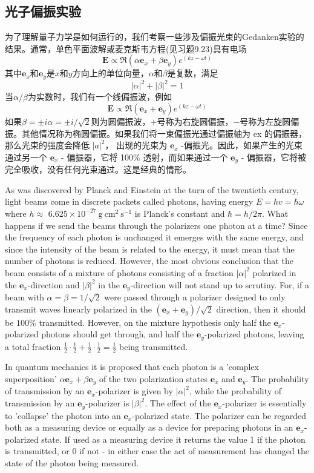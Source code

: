\documentclass[hyperref,UTF8]{ctexbook}
\begin{document}
\subsection{光子偏振实验}
为了理解量子力学是如何运行的，我们考察一些涉及偏振光束的Gedanken实验的结果。通常，单色平面波解或麦克斯韦方程(见习题9.23)具有电场
\[\mathbf{E}\propto \Re(\alpha \mathbf{e}_x+\beta\mathbf{e}_y)e^{(kz-\omega t)}\]
其中\(\mathbf{e}_x\)和\(\mathbf{e}_y\)是\(x\)和\(y\)方向上的单位向量，\(\alpha \)和\(\beta\)是复数，满足
\[|\alpha|^2+|\beta|^2=1\]
当\(\alpha/\beta\)为实数时，我们有一个线偏振波，例如
\[\mathbf{E}\propto \Re(\mathbf{e}_x+\mathbf{e}_y)e^{(kz-\omega t)}\]
如果\(\beta =\pm i\alpha = \pm i/\sqrt{2}\)则为圆偏振波，\(+\)号称为右旋圆偏振，\(-\)号称为左旋圆偏振。其他情况称为椭圆偏振。如果我们将一束偏振光通过偏振轴为 ex 的偏振器，那么光束的强度会降低 $|a|^{2}$， 出现的光束为 $\mathbf{e}_{x}$ -偏振光。因此，如果产生的光束通过另一个 $\mathbf{e}_{x}$ - 偏振器，它将 100\% 透射，而如果通过一个 $\mathbf{e}_{y}$ - 偏振器，它将被完全吸收，没有任何光束通过。这是经典的情形。

As was discovered by Planck and Einstein at the turn of the twentieth century, light beams come in discrete packets called photons, having energy $E=h v=\hbar \omega$ where $h \approx$ $6.625 \times 10^{-27} \mathrm{~g} \mathrm{~cm}^{2} \mathrm{~s}^{-1}$ is Planck's constant and $\hbar=h / 2 \pi$. What happens if we send the beams through the polarizers one photon at a time? Since the frequency of each photon is unchanged it emerges with the same energy, and since the intensity of the beam is related to the energy, it must mean that the number of photons is reduced. However, the most obvious conclusion that the beam consists of a mixture of photons consisting of a fraction $|\alpha|^{2}$ polarized in the $\mathbf{e}_{x}$-direction and $|\beta|^{2}$ in the $\mathbf{e}_{y}$-direction will not stand up to scrutiny. For, if a beam with $\alpha=\beta=1 / \sqrt{2}$ were passed through a polarizer designed to only transmit waves linearly polarized in the $\left(\mathbf{e}_{x}+\mathbf{e}_{y}\right) / \sqrt{2}$ direction, then it should be $100 \%$ transmitted. However, on the mixture hypothesis only half the $\mathbf{e}_{x}$-polarized photons should get through, and half the $\mathbf{e}_{y}$-polarized photons, leaving a total fraction $\frac{1}{2} \cdot \frac{1}{2}+\frac{1}{2} \cdot \frac{1}{2}=\frac{1}{2}$ being transmitted.

In quantum mechanics it is proposed that each photon is a 'complex superposition' $\alpha \mathbf{e}_{x}+\beta \mathbf{e}_{y}$ of the two polarization states $\mathbf{e}_{x}$ and $\mathbf{e}_{y}$. The probability of transmission by an $\mathbf{e}_{x}$-polarizer is given by $|\alpha|^{2}$, while the probability of transmission by an $\mathbf{e}_{y}$-polarizer is $|\beta|^{2}$. The effect of the $\mathbf{e}_{x}$-polarizer is essentially to 'collapse' the photon into an $\mathbf{e}_{x}$-polarized state. The polarizer can be regarded both as a measuring device or equally as a device for preparing photons in an $\mathbf{e}_{x}$-polarized state. If used as a measuring device it returns the value 1 if the photon is transmitted, or 0 if not - in either case the act of measurement has changed the state of the photon being measured.
\end{document}
